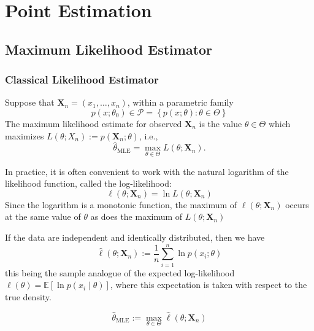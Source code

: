 \chapter{Point Estimation}

\section{Maximum Likelihood Estimator}

\subsection{Classical Likelihood Estimator}

Suppose that $\mathbf{X}_{n}=\left(x_{1},\ldots,x_{n}\right)$, within a parametric family
\begin{equation}
    p\left(x;\theta_{0}\right)\in\mathcal{P}=\left\{p(x;\theta):\theta\in\Theta\right\}
\end{equation}
The maximum likelihood estimate for observed $\mathbf{X}_{n}$ is the value $\theta\in\Theta$ which maximizes $L\left(\theta;X_{n}\right):=p\left(\mathbf{X}_{n};\theta\right)$, i.e.,
\begin{equation}
    \hat{\theta}_{\text{MLE}}=\max_{\theta\in\Theta}L\left(\theta;\mathbf{X}_{n}\right).
\end{equation}

In practice, it is often convenient to work with the natural logarithm of the likelihood function, called the log-likelihood:
\begin{equation}
    \ell\left(\theta;\mathbf{X}_{n}\right)=\ln L\left(\theta;\mathbf{X}_{n}\right)
\end{equation}
Since the logarithm is a monotonic function, the maximum of $\ell\left(\theta;\mathbf{X}_{n}\right)$ occurs at the same value of $\theta$ as does the maximum of $L\left(\theta;\mathbf{X}_{n}\right)$

If the data are independent and identically distributed, then we have
\begin{equation}
    \hat{\ell}\left(\theta;\mathbf{X}_{n}\right):=\frac{1}{n}\sum_{i=1}^{n}\ln p\left(x_{i};\theta\right)
\end{equation}
this being the sample analogue of the expected log-likelihood $\ell(\theta)=\mathbb{E}\left[\ln p\left(x_{i} \mid \theta\right)\right]$, where this expectation is taken with respect to the true density.


\begin{equation}
    \hat{\theta}_{\text{MLE}}:=\max_{\theta\in\Theta}\hat{\ell}\left(\theta;\mathbf{X}_{n}\right)
\end{equation}


